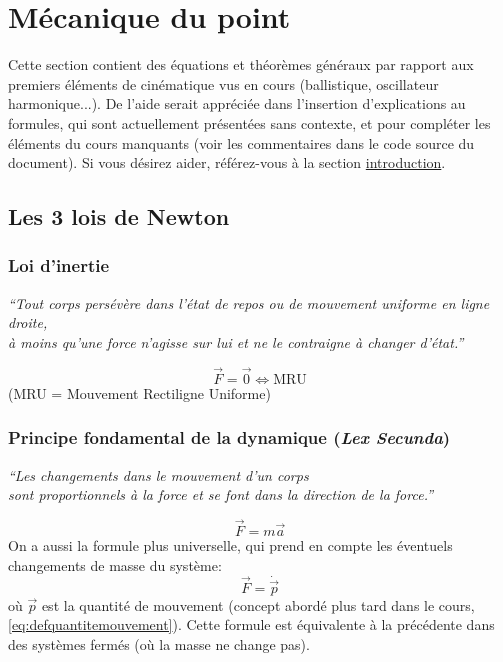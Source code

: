 \documentclass{article}
\numberwithin{equation}{section}
\begin{document}
\section{Mécanique du point}
Cette section contient des équations et théorèmes généraux par rapport aux premiers éléments de cinématique vus en cours (ballistique, oscillateur harmonique...). De l'aide serait appréciée dans l'insertion d'explications au formules, qui sont actuellement présentées sans contexte, et pour compléter les éléments du cours manquants (voir les commentaires dans le code source du document). Si vous désirez aider, référez-vous à la section \hyperref[sec:introduction]{introduction}.

\subsection{Les 3 lois de Newton}

\subsubsection{Loi d'inertie}
\begin{center}
	\emph{``Tout corps persévère dans l'état de repos ou de mouvement uniforme en ligne droite, \\
	 à moins qu'une force n'agisse sur lui et ne le contraigne à changer d'état.''}
\end{center}
\begin{equation}
	\boxed{\vec F = \vec 0 \Leftrightarrow \text{MRU}}
\end{equation}
(MRU = Mouvement Rectiligne Uniforme)

\subsubsection{Principe fondamental de la dynamique (\emph{Lex Secunda})}
\begin{center}
	\emph{``Les changements dans le mouvement d'un corps \\ sont proportionnels à la force et se font dans la direction de la force.''}
\end{center}
\begin{equation} \label{eq:lexsecunda}
	\boxed{\vec F = m \vec a}
\end{equation}
On a aussi la formule plus universelle, qui prend en compte les éventuels changements de masse du système:
\begin{equation*}
	\boxed{ \vec F = \dot{\vec p} }
\end{equation*}
où \(\vec p\) est la quantité de mouvement (concept abordé plus tard dans le cours, \ref{eq:defquantitemouvement}). Cette formule est équivalente à la précédente dans des systèmes fermés (où la masse ne change pas). \\
\end{document}
